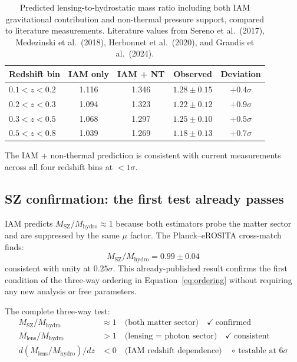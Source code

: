 \documentclass[12pt,a4paper]{article}
\begin{document}
\begin{table}[h]
\centering
\caption{Predicted lensing-to-hydrostatic mass ratio including both IAM
gravitational contribution and non-thermal pressure support, compared to
literature measurements. Literature values from Sereno et al.\ (2017),
Medezinski et al.\ (2018), Herbonnet et al.\ (2020), and Grandis et al.\ (2024).}
\label{tab:comparison}
\begin{tabular}{lcccc}
\toprule
Redshift bin & IAM only & IAM + NT & Observed & Deviation \\
\midrule
$0.1 < z < 0.2$ & 1.116 & 1.346 & $1.28 \pm 0.15$ & $+0.4\sigma$ \\
$0.2 < z < 0.3$ & 1.094 & 1.323 & $1.22 \pm 0.12$ & $+0.9\sigma$ \\
$0.3 < z < 0.5$ & 1.068 & 1.297 & $1.25 \pm 0.10$ & $+0.5\sigma$ \\
$0.5 < z < 0.8$ & 1.039 & 1.269 & $1.18 \pm 0.13$ & $+0.7\sigma$ \\
\bottomrule
\end{tabular}
\end{table}

The IAM + non-thermal prediction is consistent with current measurements across
all four redshift bins at $< 1\sigma$.

\subsection{SZ confirmation: the first test already passes}

IAM predicts $M_\mathrm{SZ}/M_\mathrm{hydro} \approx 1$ because both estimators
probe the matter sector and are suppressed by the same $\mu$ factor. The
Planck--eROSITA cross-match~\citep{Bulbul2024} finds:
\begin{equation}
M_\mathrm{SZ}/M_\mathrm{hydro} = 0.99 \pm 0.04
\end{equation}
consistent with unity at $0.25\sigma$. This already-published result confirms the
first condition of the three-way ordering in Equation~\ref{eq:ordering} without
requiring any new analysis or free parameters.

The complete three-way test:
\begin{align}
M_\mathrm{SZ}/M_\mathrm{hydro} &\approx 1 \quad \text{(both matter sector)} \quad \checkmark\ \text{confirmed} \label{eq:test1}\\
M_\mathrm{lens}/M_\mathrm{hydro} &> 1 \quad \text{(lensing = photon sector)} \quad \checkmark\ \text{consistent} \label{eq:test2}\\
d(M_\mathrm{lens}/M_\mathrm{hydro})/dz &< 0 \quad \text{(IAM redshift dependence)} \quad \circ\ \text{testable at } 6\sigma \label{eq:test3}
\end{align}
\end{document}
